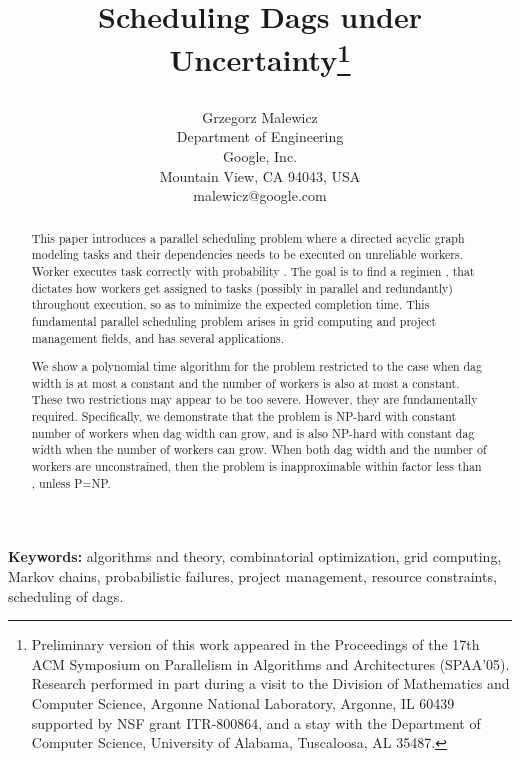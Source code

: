 \documentclass[letterpaper,11pt]{article}
\begin{document}
\title{Scheduling Dags under Uncertainty\thanks{Preliminary version of this work appeared in the Proceedings of the 17th ACM Symposium on Parallelism in Algorithms and Architectures (SPAA'05). Research performed in part during a visit to the Division of Mathematics and Computer Science, Argonne National Laboratory, Argonne, IL 60439 supported by NSF grant ITR-800864, and a stay with the Department of Computer Science, University of Alabama, Tuscaloosa, AL 35487.}
\author{
    Grzegorz Malewicz\\
    \small Department of Engineering\\
    \small Google, Inc.\\
    \small Mountain View, CA 94043, USA\\
    \small malewicz@google.com\\
}
}

\maketitle

\begin{abstract}
This paper introduces a parallel scheduling problem where a directed acyclic graph modeling  tasks and their dependencies needs to be executed on  unreliable workers. Worker  executes task  correctly with probability .
The goal is to find a regimen , that dictates how workers get assigned to tasks (possibly in parallel and redundantly) throughout execution, so as to minimize the expected completion time. 
This fundamental parallel scheduling problem arises in grid computing and project management fields, and has several applications.

We show a polynomial time algorithm for the problem restricted to the case when dag width is at most a constant and the number of workers is also at most a constant. These two restrictions may appear to be too severe. However, they are fundamentally required. Specifically, we demonstrate that the problem is NP-hard with constant number of workers when dag width can grow, and is also NP-hard with constant dag width when the number of workers can grow. When both dag width and the number of workers are unconstrained, then the problem is inapproximable within factor less than , unless P=NP.
\end{abstract}

{\bf Keywords:} algorithms and theory, combinatorial optimization, grid computing, Markov chains, probabilistic failures, project management, resource constraints, scheduling of dags.
\end{document}
